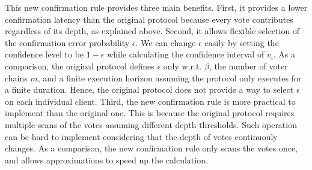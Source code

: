 This new confirmation rule provides three main benefits. First, it provides a lower confirmation latency than the original protocol because every vote contributes regardless of its depth, as explained above. Second, it allows flexible selection of the confirmation error probability $\epsilon$. We can change $\epsilon$ easily by setting the confidence level to be $1 - \epsilon$ while calculating the confidence interval of $v_i$. As a comparison, the original protocol defines $\epsilon$ only w.r.t. $\beta$, the number of voter chains $m$, and a finite execution horizon assuming the protocol only executes for a finite duration. Hence, the original protocol does not provide a way to select $\epsilon$ on each individual client. Third, the new confirmation rule is more practical to implement than the original one. This is because the original protocol requires multiple scans of the votes assuming different depth thresholds. Such operation can be hard to implement considering that the depth of votes continuouly changes. As a comparison, the new confirmation rule only scans the votes once, and allows approximations to speed up the calculation.
